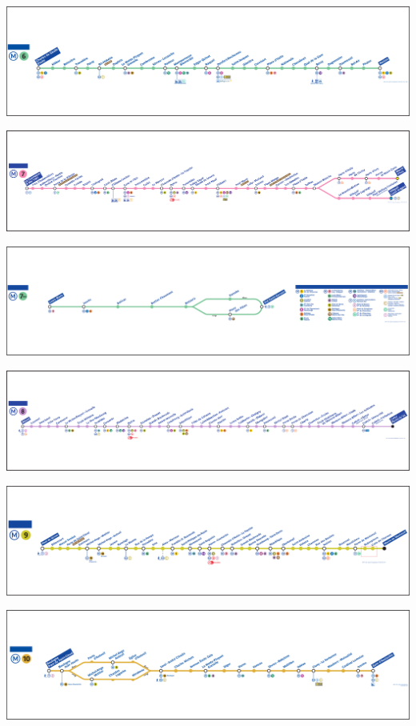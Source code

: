 \documentclass[,french]{article}
\begin{document}
\begin{landscape}
\includegraphics{img/plan_lignes/plan-de-ligne_metro_ligne-6.pdf}

\includegraphics{img/plan_lignes/plan-de-ligne_metro_ligne-7.pdf}

\includegraphics{img/plan_lignes/plan-de-ligne_metro_ligne-7b.pdf}

\includegraphics{img/plan_lignes/plan-de-ligne_metro_ligne-8.pdf}

\includegraphics{img/plan_lignes/plan-de-ligne_metro_ligne-9.pdf}

\includegraphics{img/plan_lignes/plan-de-ligne_metro_ligne-10.pdf}


\end{landscape}
\end{document}

